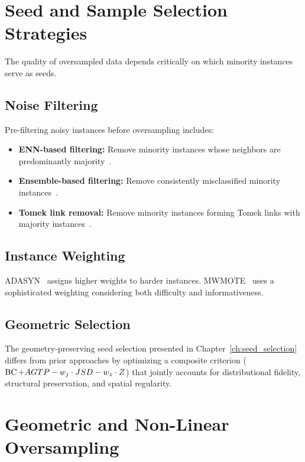 \section{Seed and Sample Selection Strategies}
\label{sec:lit:seed_selection}

The quality of oversampled data depends critically on which minority instances serve as seeds.

\subsection{Noise Filtering}

Pre-filtering noisy instances before oversampling includes:
\begin{itemize}[leftmargin=*]
  \item \textbf{ENN-based filtering:} Remove minority instances whose neighbors are predominantly majority~\cite{batista2004study}.
  \item \textbf{Ensemble-based filtering:} Remove consistently misclassified minority instances~\cite{saez2015smote}.
  \item \textbf{Tomek link removal:} Remove minority instances forming Tomek links with majority instances~\cite{tomek1976two}.
\end{itemize}

\subsection{Instance Weighting}

ADASYN~\cite{he2008adasyn} assigns higher weights to harder instances.
MWMOTE~\cite{barua2014mwmote} uses a sophisticated weighting considering both difficulty and informativeness.

\subsection{Geometric Selection}

The geometry-preserving seed selection presented in Chapter~\ref{ch:seed_selection} differs from prior approaches by optimizing a composite criterion ($\operatorname{BC} + AGTP - w_j \cdot JSD - w_z \cdot Z$) that jointly accounts for distributional fidelity, structural preservation, and spatial regularity.


\section{Geometric and Non-Linear Oversampling}
\label{sec:lit:geometric}

